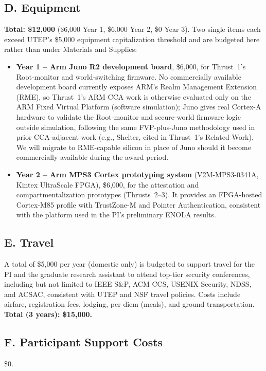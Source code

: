 \documentclass[11pt,onecolumn]{article}
\begin{document}
\subsection*{D. Equipment}
\textbf{Total: \$12,000} (\$6,000 Year 1, \$6,000 Year 2, \$0 Year 3). Two single items each exceed UTEP's
\$5,000 equipment capitalization threshold and are budgeted here rather than under Materials
and Supplies:
\begin{itemize}
	\item \textbf{Year 1 -- Arm Juno R2 development board}, \$6,000, for Thrust~1's Root-monitor
	and world-switching firmware.
	No commercially available development board currently exposes ARM's Realm Management
	Extension (RME), so Thrust~1's ARM CCA work is otherwise evaluated only on the ARM Fixed
	Virtual Platform (software simulation); Juno gives real Cortex-A hardware to validate the
	Root-monitor and secure-world firmware logic outside simulation, following the same
	FVP-plus-Juno methodology used in prior CCA-adjacent work (e.g., Shelter, cited in Thrust~1's
	Related Work). We will migrate to RME-capable silicon in place of Juno should it become
	commercially available during the award period.
	\item \textbf{Year 2 -- Arm MPS3 Cortex prototyping system} (V2M-MPS3-0341A, Kintex
	UltraScale FPGA), \$6,000, for the attestation and compartmentalization prototypes
	(Thrusts~2--3). It provides an FPGA-hosted Cortex-M85 profile with TrustZone-M and Pointer
	Authentication, consistent with the platform used in the PI's preliminary ENOLA results.

\end{itemize}

\subsection*{E. Travel}
A total of \$5,000 per year (domestic only) is budgeted to support travel for the PI and the
graduate research assistant to attend top-tier security conferences, including but not limited
to IEEE S\&P, ACM CCS, USENIX Security, NDSS, and ACSAC, consistent with UTEP and NSF
travel policies. Costs include airfare, registration fees, lodging, per diem (meals), and
ground transportation. \textbf{Total (3 years): \$15,000.}

\subsection*{F. Participant Support Costs}
\$0.
\end{document}
